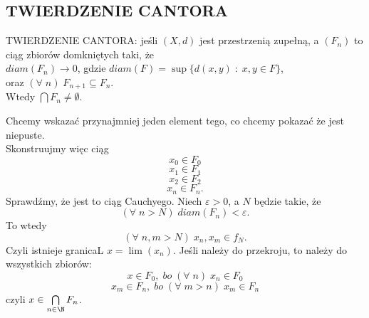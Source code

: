 \subsection{TWIERDZENIE CANTORA}
\begin{center}\large
    {\color{def}TWIERDZENIE CANTORA}: jeśli $(X, d)$ jest przestrzenią zupełną, a $(F_n)$ to ciąg zbiorów domkniętych taki, że\smallskip\\
    $diam(F_n)\to 0$, gdzie $diam(F) = \sup\{d(x, y)\;:\;x,y\in F\}$,\smallskip\\
    oraz $(\forall\;n)\;F_{n+1}\subseteq F_n$.\medskip\\
    {\color{acc}Wtedy $\bigcap F_n\neq\emptyset$.}
\end{center}
\dowod
Chcemy wskazać przynajmniej jeden element tego, co chcemy pokazać że jest niepuste. \\Skonstruujmy więc ciąg
$$x_0\in F_0$$
$$x_1\in F_1$$
$$x_2\in F_2$$
$$x_n\in F_n.$$
Sprawdźmy, że jest to ciąg Cauchyego. Niech $\varepsilon>0$, a $N$ będzie takie, że
$$(\forall\;n>N)\;diam(F_n)<\varepsilon.$$
To wtedy
$$(\forall\;n,m>N)\;x_n, x_m\in f_N.$$
Czyli istnieje granicaL $x=\lim (x_n)$. Jeśli należy do przekroju, to należy do wszystkich zbiorów:
$$x\in F_0,\;bo\;(\forall\;n)\;x_n\in F_0$$
$$x_m\in F_n,\;bo\;(\forall\;m>n)\;x_m\in F_n$$
czyli $x\in\bigcap\limits_{n\in\N} F_n$.
\kondow

